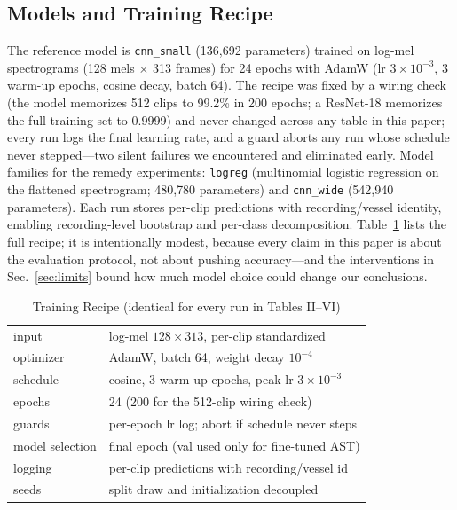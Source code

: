 ﻿\documentclass[journal]{IEEEtran}
\begin{document}
\subsection{Models and Training Recipe}
The reference model is \texttt{cnn\_small} (136{,}692 parameters) trained on log-mel spectrograms
(128 mels $\times$ 313 frames) for 24 epochs with AdamW (lr $3\times10^{-3}$, 3 warm-up epochs,
cosine decay, batch 64). The recipe was fixed by a wiring check (the model memorizes 512 clips to
99.2\% in 200 epochs; a ResNet-18 memorizes the full training set to 0.9999) and never changed
across any table in this paper; every run logs the final learning rate, and a guard aborts any run
whose schedule never stepped---two silent failures we encountered and eliminated early. Model
families for the remedy experiments: \texttt{logreg} (multinomial logistic regression on the
flattened spectrogram; 480{,}780 parameters) and \texttt{cnn\_wide} (542{,}940 parameters). Each
run stores per-clip predictions with recording/vessel identity, enabling recording-level bootstrap
and per-class decomposition. Table~\ref{tab:recipe} lists the full recipe; it is intentionally
modest, because every claim in this paper is about the evaluation protocol, not about pushing
accuracy---and the interventions in Sec.~\ref{sec:limits} bound how much model choice could change
our conclusions.

\begin{table}[!t]
\caption{Training Recipe (identical for every run in Tables II--VI)}
\label{tab:recipe}
\centering
\footnotesize\setlength{\tabcolsep}{3.2pt}
\begin{tabular}{ll}
\toprule
input & log-mel $128\times313$, per-clip standardized \\
optimizer & AdamW, batch 64, weight decay $10^{-4}$ \\
schedule & cosine, 3 warm-up epochs, peak lr $3\times10^{-3}$ \\
epochs & 24 (200 for the 512-clip wiring check) \\
guards & per-epoch lr log; abort if schedule never steps \\
model selection & final epoch (val used only for fine-tuned AST) \\
logging & per-clip predictions with recording/vessel id \\
seeds & split draw and initialization decoupled \\
\bottomrule
\end{tabular}
\end{table}
\end{document}
